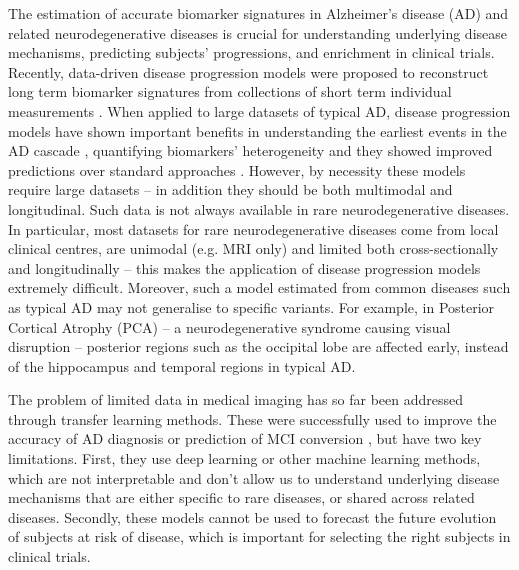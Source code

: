 \documentclass{llncs}
\begin{document}
The estimation of accurate biomarker signatures in Alzheimer's disease (AD) and related neurodegenerative diseases is crucial for understanding underlying disease mechanisms, predicting subjects' progressions, and enrichment in clinical trials. Recently, data-driven disease progression models were proposed to reconstruct long term biomarker signatures from collections of short term individual measurements \cite{lorenzi2017disease,oxtoby2018,jedynak2012computational}. When applied to large datasets of typical AD, disease progression models have shown important benefits in understanding the earliest events in the AD cascade \cite{oxtoby2018}, quantifying biomarkers' heterogeneity \cite{young2018uncovering} and they showed improved predictions over standard approaches \cite{oxtoby2018}. However, by necessity these models require large datasets -- in addition they should be both multimodal and longitudinal. Such data is not always available in rare neurodegenerative diseases. In particular, most datasets for rare neurodegenerative diseases come from local clinical centres, are unimodal (e.g. MRI only) and limited both cross-sectionally and longitudinally -- this makes the application of disease progression models extremely difficult.  Moreover, such a model estimated from common diseases such as typical AD may not generalise to specific variants. For example, in Posterior Cortical Atrophy (PCA) -- a neurodegenerative syndrome causing visual disruption -- posterior regions such as the occipital lobe are affected early, instead of the hippocampus and temporal regions in typical AD. 

The problem of limited data in medical imaging has so far been addressed through transfer learning methods. These were successfully used to improve the accuracy of AD diagnosis \cite{hon2017towards} or prediction of MCI conversion \cite{cheng2015domain}, but have two key limitations. First, they use deep learning or other machine learning methods, which are not interpretable and don't allow us to understand underlying disease mechanisms that are either specific to rare diseases, or shared across related diseases. Secondly, these models cannot be used to forecast the future evolution of subjects at risk of disease, which is important for selecting the right subjects in clinical trials. 
\end{document}
